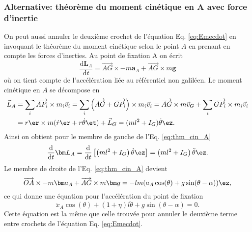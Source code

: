 \subsubsection*{Alternative: théorème du moment cinétique en A avec force d'inertie}
On peut aussi annuler le deuxième crochet de l'équation Eq. \eqref{eq:Emecdot} en invoquant le théorème du moment cinétique selon le point $A$ en prenant en compte les forces d'inerties.
Au point de fixation A on écrit
\begin{equation}
    \frac{\mathrm d \bm{L}_A}{\mathrm d t} = \overrightarrow{AG}\times-m\bm a_A + \overrightarrow{AG}\times m\bm g
    \label{eq:thm_cin_A}
\end{equation}
où on tient compte de l'accélération liée au référentiel non galiléen.
Le moment cinétique en $A$ se décompose en
\begin{align*}
    \vec L_A &= \sum_i \overrightarrow{AP_i}\times m_i \vec v_i = \sum_i \left(\overrightarrow{AG}+\overrightarrow{GP_i}\right)\times m_i \vec v_i = \overrightarrow{AG}\times m \vec v_G + \sum_i\overrightarrow{GP_i}\times m_i \vec v_i \\
    &= r \er \times m(\dot r \er + r\dot\theta \et) + \vec L_G = (ml^2 + I_G) \dot\theta \ez.
\end{align*}
Ainsi on obtient pour le membre de gauche de l'Eq. \eqref{eq:thm_cin_A}
$$
\frac{\mathrm d }{\mathrm d t}\bm L_A = \frac{\mathrm d }{\mathrm d t}\left[\left(ml^2+I_G\right)\dot\theta\ez\right] = \left(ml^2+I_G\right)\ddot\theta\ez.
$$
Le membre de droite de l'Eq. \eqref{eq:thm_cin_A} devient
$$
\overrightarrow{OA}\times-m\bm a_A + \overrightarrow{AG}\times m\bm g=-lm(a_A\cos(\theta) + g\sin(\theta-\alpha))\ez,
$$
ce qui donne une équation pour l'accélération du point de fixation
\begin{equation}
    \ddot x_A \cos(\theta) + (1+\eta) l \ddot\theta + g\sin(\theta-\alpha) = 0.
    \label{eq:a_A}
\end{equation}
Cette équation est la même que celle trouvée pour annuler le deuxième terme entre crochets de l'équation Eq. \eqref{eq:Emecdot}.